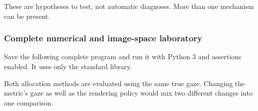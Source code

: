 These are hypotheses to test, not automatic diagnoses. More than one mechanism can be present.

\subsubsection{Complete numerical and image-space laboratory}\label{04-visual-computing-ii-ch043-complete-numerical-and-image-space-laboratory}

\hypertarget{04-visual-computing-ii-ch043-complete-numerical-and-image-space-laboratory}{}

Save the following complete program and run it with Python 3 and assertions enabled. It uses only the standard library.

Both allocation methods are evaluated using the same true gaze. Changing the metric's gaze as well as the rendering policy would mix two different changes into one comparison.

